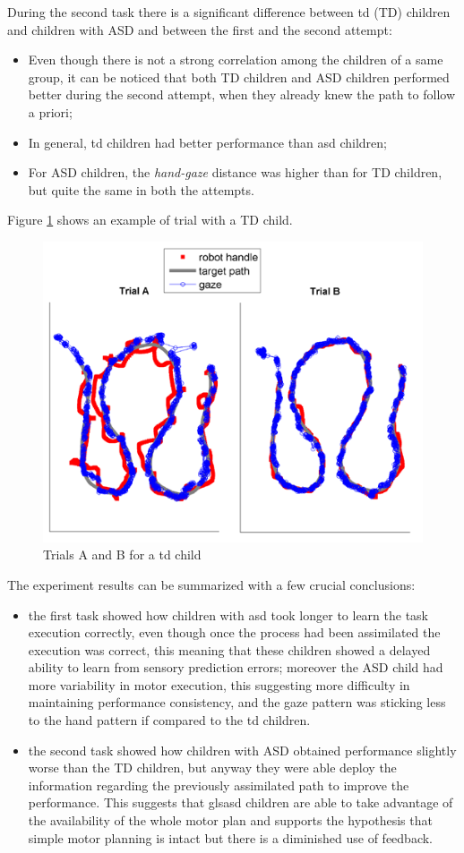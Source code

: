 \documentclass[12pt,journal,draftclsnofoot,onecolumn]{IEEEtran}
\makeatletter
\let\origsubsubsection\subsubsection
\renewcommand\subsubsection{\@ifstar{\starsubsubsection}{\nostarsubsubsection}}
\newcommand\nostarsubsubsection[1]
{\subsubsectionprelude\origsubsubsection{#1}}
\newcommand\subsubsectionprelude{%
  \vspace{6pt}
}
\makeatother
\begin{document}
During the second task there is a significant difference between \gls{td} (TD) children and children with ASD and between the first and the second attempt:
\begin{itemize}
\item Even though there is not a strong correlation among the children of a same group, it can be noticed that both TD children and ASD children performed better during the second attempt, when they already knew the path to follow a priori;
\item In general, \gls{td} children had better performance than \gls{asd} children;
\item For ASD children, the \textit{hand-gaze} distance was higher than for TD children, but quite the same in both the attempts.
\end{itemize}

Figure \ref{path} shows an example of trial with a TD child.

\begin{figure}[t]
\centering
\includegraphics[width = .55\textwidth]{path.png}
\caption{Trials A and B for a \gls{td} child}
\label{path}
\end{figure}

\subsubsection{summary observations}
\label{sec:summary}

The experiment results can be summarized with a few crucial conclusions:
\begin{itemize}
\item the first task showed how children with \gls{asd} took longer to learn the task execution correctly, even though once the process had been assimilated the execution was correct, this meaning that these children showed a delayed ability to learn from sensory prediction errors; moreover the ASD child had more variability in motor execution, this suggesting more difficulty in maintaining performance consistency, and the gaze pattern was sticking less to the hand pattern if compared to the \gls{td} children.
\item the second task showed how children with ASD obtained performance slightly worse than the TD children, but anyway they were able deploy the information regarding the previously assimilated path to improve the performance. This suggests that gls{asd} children are able to take advantage of the availability of the whole motor plan and supports the hypothesis that simple motor planning is intact but there is a diminished use of feedback.
\end{itemize}
\end{document}
